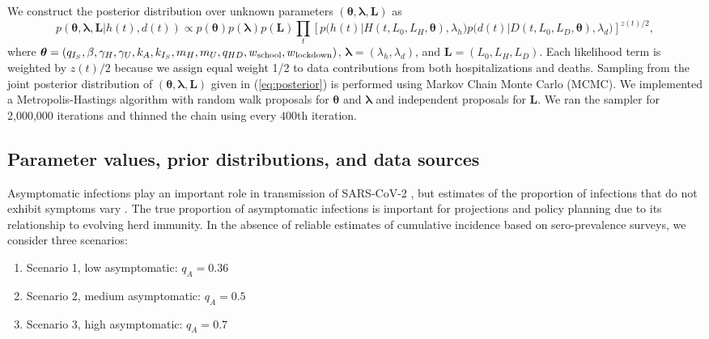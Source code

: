 \documentclass[11pt]{article}
\newcommand{\bL}{\mathbf{L}}
\newcommand{\btheta}{\boldsymbol{\theta}}
\newcommand{\blambda}{\boldsymbol{\lambda}}
\begin{document}
We construct the posterior distribution over unknown parameters $(\btheta, \blambda, \bL)$ as 
\begin{equation}
p(\btheta, \blambda, \bL | h(t), d(t)) \propto p(\btheta) p(\blambda) p(\bL)
							 \prod_t \left[ p\big(h(t)| H(t, L_0, L_H, \btheta), \lambda_h \big)
							         p\big(d(t)| D(t, L_0, L_D, \btheta), \lambda_d \big) \right]^{z(t)/2},
\label{eq:posterior}
\end{equation}
where $\btheta = (q_{I_S}, \beta, \gamma_H, \gamma_U, k_A, k_{I_S}, m_H, m_U, q_{HD}, w\textsubscript{school}, w\textsubscript{lockdown})$, $\blambda = (\lambda_h, \lambda_d)$, and $\bL = (L_0, L_H, L_D)$. Each likelihood term is weighted by $z(t)/2$ because we assign equal weight 1/2 to data contributions from both hospitalizations and deaths.  Sampling from the joint posterior distribution of $(\btheta, \blambda, \bL)$  given in (\ref{eq:posterior}) is performed using Markov Chain Monte Carlo (MCMC). We implemented a Metropolis-Hastings algorithm with random walk proposals for $\btheta$ and $\blambda$ and independent proposals for $\bL$. We ran the sampler for 2,000,000 iterations and thinned the chain using every $400$th iteration.




\subsection{Parameter values, prior distributions, and data sources}

Asymptomatic infections play an important role in transmission of SARS-CoV-2 \citep{furukawa2020evidence, liu2020contribution, emery2020contribution, he2020temporal}, but estimates of the proportion of infections that do not exhibit symptoms vary \citep{he2020estimation, nishiura2020estimation, mizumoto2020estimating, emery2020contribution, lavezzo2020suppression, campbell2020prevalence}. The true proportion of asymptomatic infections is important for projections and policy planning due to its relationship to evolving herd immunity. In the absence of reliable estimates of cumulative incidence based on sero-prevalence surveys, we consider three scenarios: 

\begin{enumerate}
	\item Scenario 1, low asymptomatic: $q_A = 0.36$
	\item Scenario 2, medium asymptomatic: $q_A = 0.5$
	\item Scenario 3, high asymptomatic: $q_A = 0.7$
\end{enumerate}
\end{document}
